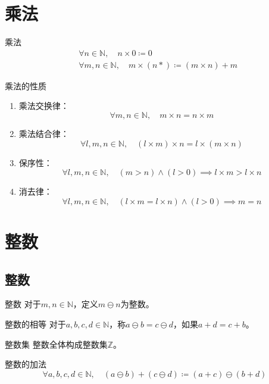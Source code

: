 \documentclass[lang = cn, scheme = chinese, thmcnt = section]{elegantbook}
\newcommand{\N}{\mathbb{N}}            %
\newcommand{\Z}{\mathbb{Z}}            %
\begin{document}
\section{乘法}

\begin{definition}{乘法}
	\begin{align*}
		& \forall n\in\N,\quad n\times 0\coloneqq 0\\
		& \forall m,n\in\N,\quad m\times (n*)\coloneqq (m\times n)+m
	\end{align*}
\end{definition}

\begin{proposition}{乘法的性质}
	\begin{enumerate}
		\item 乘法交换律：
		$$
		\forall m,n\in\N,\quad m\times n=n\times m
		$$
		\item 乘法结合律：
		$$
		\forall l,m,n\in\N,\quad (l\times m)\times n=l\times (m\times n)
		$$
		\item 保序性：
		$$
		\forall l,m,n\in\N,\quad (m>n)\wedge(l>0)\implies l\times m>l\times n
		$$
		\item 消去律：
		$$
		\forall l,m,n\in\N,\quad (l\times m=l\times n)\wedge(l>0)\implies m=n
		$$
	\end{enumerate}
\end{proposition}

\section{整数}

\subsection{整数}

\begin{definition}{整数}
	对于$m,n\in\N$，定义$m\ominus n$为整数。
\end{definition}

\begin{definition}{整数的相等}
	对于$a,b,c,d\in\N$，称$a\ominus b=c\ominus d$，如果$a+d=c+b$。
\end{definition}

\begin{definition}{整数集}
	整数全体构成整数集$\Z$。
\end{definition}

\begin{definition}{整数的加法}
	$$
	\forall a,b,c,d\in\N,\quad (a\ominus b)+(c\ominus d)\coloneqq (a+c)\ominus(b+d)
	$$
\end{definition}
\end{document}
